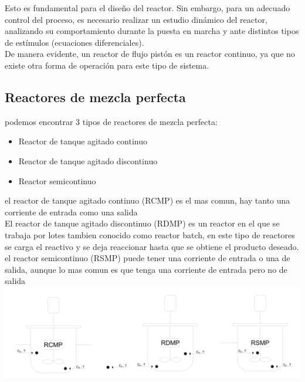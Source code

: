 \documentclass{report}
\begin{document}
\noindent Esto es fundamental para el diseño del reactor. Sin embargo, para un adecuado control del proceso, es necesario realizar un estudio dinámico del reactor, analizando su comportamiento durante la puesta en marcha y ante distintos tipos de estímulos (ecuaciones diferenciales).\\

\noindent De manera evidente, un reactor de flujo pistón es un reactor continuo, ya que no existe otra forma de operación para este tipo de sistema.
\subsection{Reactores de mezcla perfecta}
podemos encontrar 3 tipos de reactores de mezcla perfecta: 
\begin{itemize}
	\item Reactor de tanque agitado continuo
	\item Reactor de tanque agitado discontinuo
	\item Reactor semicontinuo
\end{itemize}
\vspace{2\baselineskip}
\noindent el reactor de tanque agitado continuo (RCMP) es el mas comun, hay tanto una corriente de entrada como una salida\\

\noindent El reactor de tanque agitado discontinuo (RDMP) es un reactor en el que se trabaja por lotes tambien conocido como reactor batch, en este tipo de reactores se carga el reactivo 
y se deja reaccionar hasta que se obtiene el producto deseado.\\

\noindent el reactor semicontinuo (RSMP) puede tener una corriente de entrada o una de salida, aunque lo mas comun es que tenga una corriente de entrada pero no de salida\\

\includegraphics[width=1\textwidth]{RMP.PNG}
\end{document}
